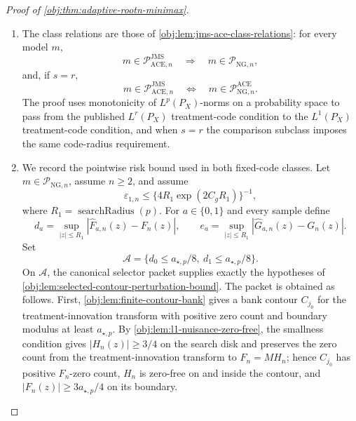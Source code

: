 \documentclass[11pt]{article}
\begin{document}
\begin{proof}[Proof of \cref{obj:thm:adaptive-rootn-minimax}]
\begin{enumerate}
\item The class relations are those of \cref{obj:lem:jms-ace-class-relations}: for every model \(m\),
\[
m\in\mathcal P_{\mathrm{ACE},n}^{\mathrm{JMS}}
\quad\Longrightarrow\quad
m\in\mathcal P_{\mathrm{NG},n},
\]
and, if \(s=r\),
\[
m\in\mathcal P_{\mathrm{ACE},n}^{\mathrm{JMS}}
\quad\Longleftrightarrow\quad
m\in\mathcal P_{\mathrm{NG},n}^{\mathrm{ACE}}.
\]
The proof uses monotonicity of \(L^p(P_X)\)-norms on a probability space to pass from the published \(L^r(P_X)\) treatment-code condition to the \(L^1(P_X)\) treatment-code condition, and when \(s=r\) the comparison subclass imposes the same code-radius requirement. %

\item We record the pointwise risk bound used in both fixed-code classes.  Let \(m\in\mathcal P_{\mathrm{NG},n}\), assume \(n\ge2\), and assume
\[
\varepsilon_{1,n}\le
\{4R_1\exp(2C_gR_1)\}^{-1},
\]
where \(R_1=\operatorname{searchRadius}(p)\).  For \(a\in\{0,1\}\) and every sample define
\[
d_a=\sup_{|z|\le R_1}|\widehat F_{a,n}(z)-F_n(z)|,
\qquad
e_a=\sup_{|z|\le R_1}|\widehat G_{a,n}(z)-G_n(z)|.
\]
Set
\[
\mathcal A=\{d_0\le a_{\star,p}/8,
              \ d_1\le a_{\star,p}/8\}.
\]
On \(\mathcal A\), the canonical selector packet supplies exactly the hypotheses of \cref{obj:lem:selected-contour-perturbation-bound}.  The packet is obtained as follows.  First, \cref{obj:lem:finite-contour-bank} gives a bank contour \(C_{j_0}\) for the treatment-innovation transform with positive zero count and boundary modulus at least \(a_{\star,p}\).  By \cref{obj:lem:l1-nuisance-zero-free}, the smallness condition gives \(|H_n(z)|\ge3/4\) on the search disk and preserves the zero count from the treatment-innovation transform to \(F_n=M H_n\); hence \(C_{j_0}\) has positive \(F_n\)-zero count, \(H_n\) is zero-free on and inside the contour, and \(|F_n(z)|\ge3a_{\star,p}/4\) on its boundary.


\end{enumerate}
\end{proof}
\end{document}
